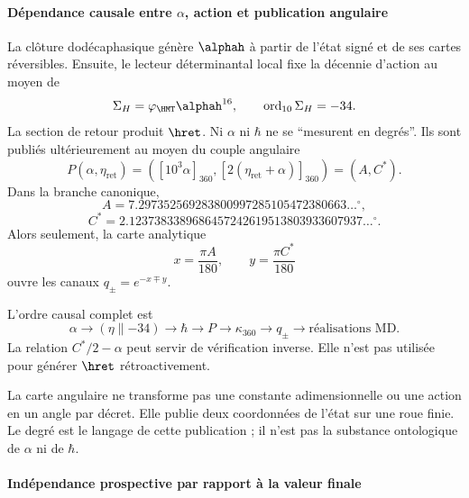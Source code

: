 \paragraph{Dépendance causale entre \(\alpha\), action et publication angulaire}

La clôture dodécaphasique génère \(\alphah\) à partir de l'état signé et de ses
cartes réversibles. Ensuite, le lecteur déterminantal local fixe la décennie
d'action au moyen de
\[
\Sigma_H=\varphi_{\HMT}\alphah^{16},
\qquad \operatorname{ord}_{10}\Sigma_H=-34.
\]
La section de retour produit \(\hret\). Ni \(\alpha\) ni \(\hbar\) ne se
\enquote{mesurent en degrés}. Ils sont publiés ultérieurement au moyen du couple angulaire
\begin{equation}
P(\alpha,\eta_{\mathrm{ret}})=
\left([10^3\alpha]_{360},[2(\eta_{\mathrm{ret}}+\alpha)]_{360}\right)
=(A,C^*).
\label{eq:parangular}
\end{equation}
Dans la branche canonique,
\[
A=7.297352569283800997285105472380663\ldots{}^\circ,
\]
\[
C^*=2.1237383389686457242619513803933607937\ldots{}^\circ.
\]
Alors seulement, la carte analytique
\[
x=\frac{\pi A}{180},\qquad y=\frac{\pi C^*}{180}
\]
ouvre les canaux \(q_\pm=e^{-x\mp y}\).

L’ordre causal complet est
\[
\alpha\to(\eta\parallel-34)\to\hbar
\to P\to\kappa_{360}\to q_\pm
\to\text{réalisations MD}.
\]
La relation \(C^*/2-\alpha\) peut servir de vérification inverse. Elle n'est pas utilisée
pour générer \(\hret\) rétroactivement.

\begin{narrativebox}
La carte angulaire ne transforme pas une constante adimensionnelle ou une action en un
angle par décret. Elle publie deux coordonnées de l'état sur une roue finie.
Le degré est le langage de cette publication ; il n'est pas la substance ontologique de
\(\alpha\) ni de \(\hbar\).
\end{narrativebox}
\paragraph{Indépendance prospective par rapport à la valeur finale}


